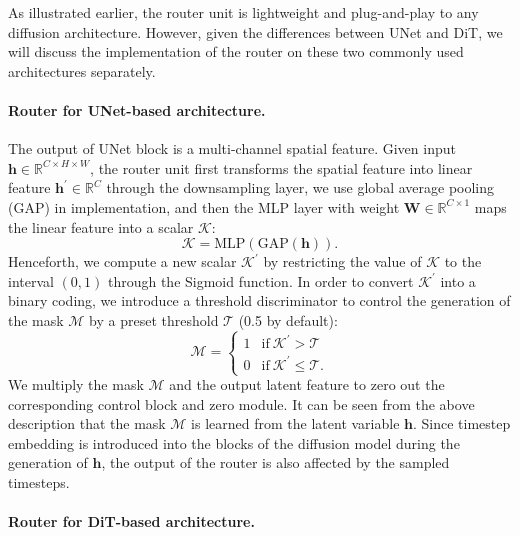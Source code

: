 As illustrated earlier, the router unit is lightweight and plug-and-play to any diffusion architecture. However, given the differences between UNet and DiT, we will discuss the implementation of the router on these two commonly used architectures separately.

\paragraph{Router for UNet-based architecture.}
The output of UNet block is a multi-channel spatial feature. Given input $\mathbf{h}\in\mathbb{R}^{C\times H\times W}$, the router unit first transforms the spatial feature into linear feature $\mathbf{h}^{'}\in\mathbb{R}^{C}$ through the downsampling layer, we use global average pooling (GAP) in implementation, and then the MLP layer with weight $\mathbf{W}\in \mathbb{R}^{C\times 1}$ maps the linear feature into a scalar $\mathcal{K}$:
\begin{equation}
   \mathcal{K}=\mathrm{MLP}\left(\mathrm{GAP}\left(\mathbf{h}\right)\right).  
\end{equation}
Henceforth, we compute a new scalar $\mathcal{K}^{'}$ by restricting the value of $\mathcal{K}$ to the interval $\left(0,1\right)$ through the Sigmoid function. In order to convert $\mathcal{K}^{'}$ into a binary coding, we introduce a threshold discriminator to control the generation of the mask $\mathcal{M}$ by a preset threshold $\mathcal{T}$ (0.5 by default):
\begin{equation}
\mathcal{M}=
\begin{cases}
    1 & \text{if} \ \mathcal{K}^{'}> \mathcal{T} \\
    0 & \text{if} \ \mathcal{K}^{'}\le \mathcal{T}.
\end{cases}
\label{eq:discriminator}
\end{equation}
We multiply the mask $\mathcal{M}$ and the output latent feature to zero out the corresponding control block and zero module. It can be seen from the above description that the mask $\mathcal{M}$ is learned from the latent variable $\mathbf{h}$. Since timestep embedding is introduced into the blocks of the diffusion model during the generation of $\mathbf{h}$, the output of the router is also affected by the sampled timesteps.

\paragraph{Router for DiT-based architecture.}

